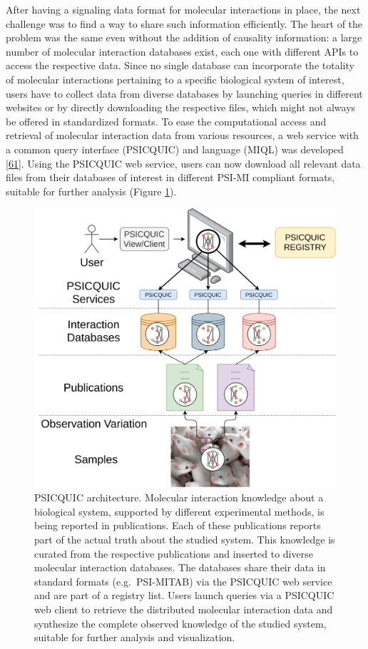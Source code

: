 \documentclass[
  12pt,
]{book}
\begin{document}
After having a signaling data format for molecular interactions in place, the next challenge was to find a way to share such information efficiently.
The heart of the problem was the same even without the addition of causality information: a large number of molecular interaction databases exist, each one with different APIs to access the respective data.
Since no single database can incorporate the totality of molecular interactions pertaining to a specific biological system of interest, users have to collect data from diverse databases by launching queries in different websites or by directly downloading the respective files, which might not always be offered in standardized formats.
To ease the computational access and retrieval of molecular interaction data from various resources, a web service with a common query interface (PSICQUIC) and language (MIQL) was developed {[}\protect\hyperlink{ref-Aranda2011}{61}{]}.
Using the PSICQUIC web service, users can now download all relevant data files from their databases of interest in different PSI-MI compliant formats, suitable for further analysis (Figure \ref{fig:fig4}).



\newpage

\begin{figure}
\includegraphics[width=0.9\linewidth]{img/psicquic} \caption{PSICQUIC architecture. Molecular interaction knowledge about a biological system, supported by different experimental methods, is being reported in publications. Each of these publications reports part of the actual truth about the studied system. This knowledge is curated from the respective publications and inserted to diverse molecular interaction databases. The databases share their data in standard formats (e.g.~PSI-MITAB) via the PSICQUIC web service and are part of a registry list. Users launch queries via a PSICQUIC web client to retrieve the distributed molecular interaction data and synthesize the complete observed knowledge of the studied system, suitable for further analysis and visualization.}\label{fig:fig4}
\end{figure}
\end{document}
